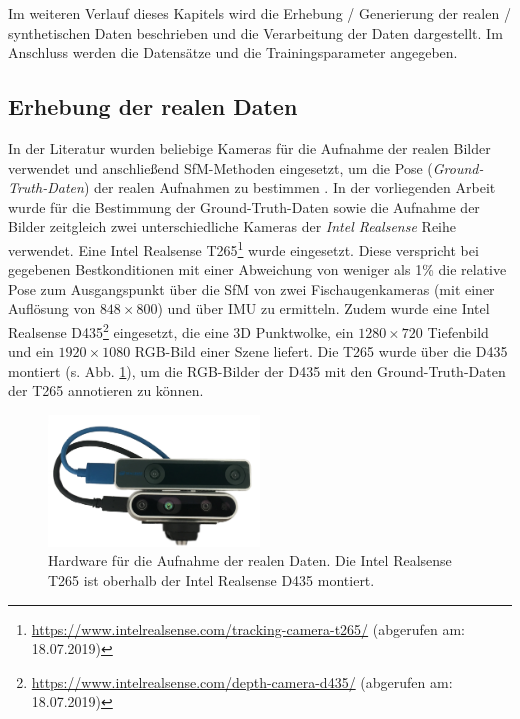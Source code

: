 Im weiteren Verlauf dieses Kapitels wird die Erhebung / Generierung der realen / synthetischen Daten beschrieben und die Verarbeitung der Daten dargestellt. Im Anschluss werden die Datensätze und die Trainingsparameter angegeben. 



\subsection{Erhebung der realen Daten}
\label{subsec:record_real_data}
In der Literatur wurden beliebige Kameras für die Aufnahme der realen Bilder verwendet und anschließend SfM-Methoden eingesetzt, um die Pose (\textit{Ground-Truth-Daten}) der realen Aufnahmen zu bestimmen \cite{kendallPoseNetConvolutionalNetwork2015, clarkVidLocDeepSpatioTemporal2017, acharyaBIMPoseNetIndoorCamera2019}. 
In der vorliegenden Arbeit wurde für die Bestimmung der Ground-Truth-Daten sowie die Aufnahme der Bilder zeitgleich zwei unterschiedliche Kameras der \textit{Intel Realsense} Reihe verwendet. Eine Intel Realsense T265\footnote{\url{https://www.intelrealsense.com/tracking-camera-t265/} (abgerufen am: 18.07.2019)} wurde eingesetzt. Diese verspricht bei gegebenen Bestkonditionen mit einer Abweichung von weniger als 1\% die relative Pose zum Ausgangspunkt über die SfM von zwei Fischaugenkameras (mit einer Auflösung von $848 \times 800$) und über IMU zu ermitteln. Zudem wurde eine Intel Realsense D435\footnote{ \url{https://www.intelrealsense.com/depth-camera-d435/} (abgerufen am: 18.07.2019)} eingesetzt, die eine 3D Punktwolke, ein $1280\times720$ Tiefenbild und ein $1920\times1080$ RGB-Bild einer Szene liefert. Die T265 wurde über die D435 montiert (s. Abb. \ref{fig:t265_d435}), um die RGB-Bilder der D435 mit den Ground-Truth-Daten der T265 annotieren zu können.

\begin{figure}
	\centering
	\includegraphics[width=0.5\textwidth]{images/real_dataset/t265_d435_2.png}
	\caption{Hardware für die Aufnahme der realen Daten. Die Intel Realsense T265 ist oberhalb der Intel Realsense D435 montiert.}
	\label{fig:t265_d435}
\end{figure}

